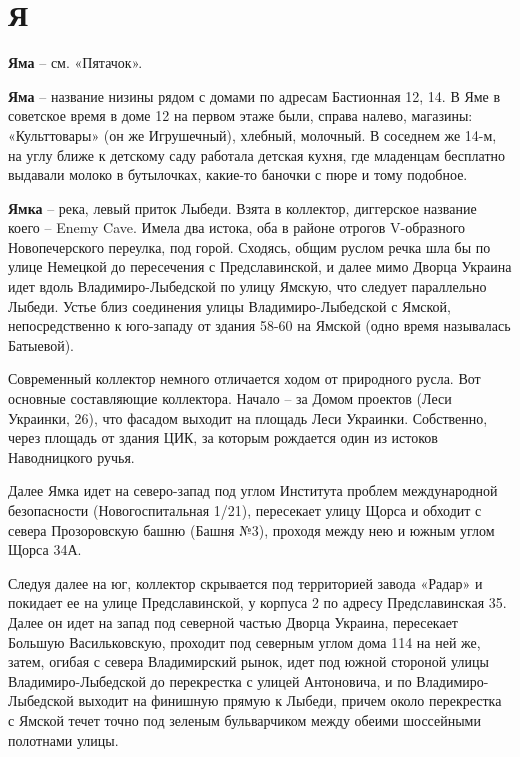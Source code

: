 \chapter*{Я}

\textbf{Яма} – см. «Пятачок».\\

\medskip

\textbf{Яма} – название низины рядом с домами по адресам Бастионная 12, 14. В Яме в советское время в доме 12 на первом этаже были, справа налево, магазины: «Культтовары» (он же Игрушечный), хлебный, молочный. В соседнем же 14-м, на углу ближе к детскому саду работала детская кухня, где младенцам бесплатно выдавали молоко в бутылочках, какие-то баночки с пюре и тому подобное.\\

\medskip

\textbf{Ямка} – река, левый приток Лыбеди. Взята в коллектор, диггерское название коего – Enemy Cave. Имела два истока, оба в районе отрогов V-образного Новопечерского переулка, под горой. Сходясь, общим руслом речка шла бы по улице Немецкой до пересечения с Предславинской, и далее мимо Дворца Украина идет вдоль Владимиро-Лыбедской по улицу Ямскую, что следует параллельно Лыбеди. Устье близ соединения улицы Владимиро-Лыбедской с Ямской, непосредственно к юго-западу от здания 58-60 на Ямской (одно время называлась Батыевой).

Современный коллектор немного отличается ходом от природного русла. Вот основные составляющие коллектора. Начало – за Домом проектов (Леси Украинки, 26), что фасадом выходит на площадь Леси Украинки. Собственно, через площадь от здания ЦИК, за которым рождается один из истоков Наводницкого ручья.

Далее Ямка идет на северо-запад под углом Института проблем международной безопасности (Новогоспитальная 1/21), пересекает улицу Щорса и обходит с севера Прозоровскую башню (Башня №3), проходя между нею и южным углом Щорса 34А. 

Следуя далее на юг, коллектор скрывается под территорией завода «Радар» и покидает ее на улице Предславинской, у корпуса 2 по адресу Предславинская 35. Далее он идет на запад под северной частью Дворца Украина, пересекает Большую Васильковскую, проходит под северным углом дома 114 на ней же, затем, огибая с севера Владимирский рынок, идет под южной стороной улицы Владимиро-Лыбедской до перекрестка с улицей Антоновича, и по Владимиро-Лыбедской выходит на финишную прямую к Лыбеди, причем около перекрестка с Ямской течет точно под зеленым бульварчиком между обеими шоссейными полотнами улицы.

